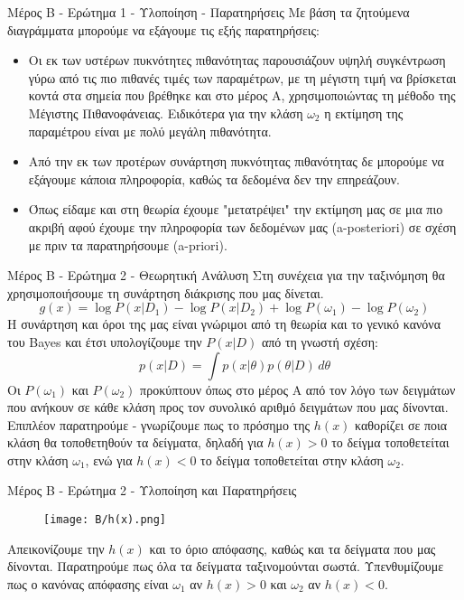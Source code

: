 \documentclass{beamer}
\begin{document}
\begin{frame}{Μέρος B - Ερώτημα 1 - Υλοποίηση - Παρατηρήσεις}
Με βάση τα ζητούμενα διαγράμματα μπορούμε να εξάγουμε τις εξής παρατηρήσεις:
\begin{itemize}
    \item Οι εκ των υστέρων πυκνότητες πιθανότητας παρουσιάζουν υψηλή συγκέντρωση γύρω από τις πιο πιθανές τιμές των παραμέτρων, με τη μέγιστη τιμή να βρίσκεται κοντά στα σημεία που βρέθηκε και στο μέρος Α, χρησιμοποιώντας τη μέθοδο της Μέγιστης Πιθανοφάνειας. Ειδικότερα για την κλάση $\omega_2$ η εκτίμηση της παραμέτρου είναι με πολύ μεγάλη πιθανότητα.
    \item Από την εκ των προτέρων συνάρτηση πυκνότητας πιθανότητας δε μπορούμε να εξάγουμε κάποια πληροφορία, καθώς τα δεδομένα δεν την επηρεάζουν.
    \item Όπως είδαμε και στη θεωρία έχουμε "μετατρέψει" την εκτίμηση μας σε μια πιο ακριβή αφού έχουμε την πληροφορία των δεδομένων μας (a-posteriori) σε σχέση με πριν τα παρατηρήσουμε (a-priori).
\end{itemize}
\end{frame}
\begin{frame}{Μέρος B - Ερώτημα 2 - Θεωρητική Ανάλυση}
    Στη συνέχεια για την ταξινόμηση θα χρησιμοποιήσουμε τη συνάρτηση διάκρισης που μας δίνεται.
     $$g(x) = \log P(x | D_1) - \log P(x | D_2) + \log P(\omega_1) - \log P(\omega_2)$$
Η συνάρτηση και όροι της μας είναι γνώριμοι από τη θεωρία και το γενικό κανόνα του Bayes και έτσι υπολογίζουμε την $P(x|D)$ από τη γνωστή σχέση:
$$p(x|D) = \int p(x |\theta) p(\theta | D) \, d\theta$$
Οι $P(\omega_1)$ και $P(\omega_2)$ προκύπτουν όπως στο μέρος Α από τον λόγο των δειγμάτων που ανήκουν σε κάθε κλάση προς τον συνολικό αριθμό δειγμάτων που μας δίνονται.\\
Επιπλέον παρατηρούμε - γνωρίζουμε πως το πρόσημο της $h(x)$ καθορίζει σε ποια κλάση θα τοποθετηθούν τα δείγματα, δηλαδή για $h(x) > 0 $ το δείγμα τοποθετείται στην κλάση $\omega_1$, ενώ για $h(x) < 0 $ το δείγμα τοποθετείται στην κλάση $\omega_2$.
\end{frame}
\begin{frame}{Μέρος Β - Ερώτημα 2 - Υλοποίηση και Παρατηρήσεις}
\begin{minipage}{\textwidth}
\begin{figure}
    \centering
    \texttt{[image: B/h(x).png]}   
\end{figure}
\end{minipage}
\begin{minipage}{\textwidth}
 Απεικονίζουμε την $h(x)$ και το όριο απόφασης, καθώς και τα δείγματα που μας δίνονται.
Παρατηρούμε πως όλα τα δείγματα ταξινομούνται σωστά. Υπενθυμίζουμε πως ο κανόνας απόφασης είναι $\omega_1$ αν $h(x)>0$ και $\omega_2$ αν $h(x)<0$.
\end{minipage}
\end{frame}
\end{document}
